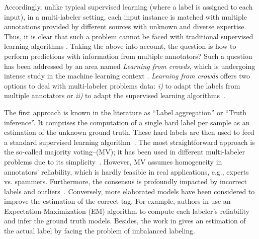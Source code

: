 \documentclass[journal]{IEEEtran}
\begin{document}
Accordingly, unlike typical supervised learning (where a label is assigned to each input), in a multi-labeler setting, each input instance is matched with multiple annotations provided by different sources with unknown and diverse expertise. Thus, it is clear that such a problem cannot be faced with traditional supervised learning algorithms \cite{tao2018domain,wang2016bi}. Taking the above into account, the question is how to perform predictions with information from multiple annotators? Such a question has been addressed by an area named \emph{Learning from crowds}, which is undergoing intense study in the machine learning context \cite{groot2011learning}. \emph{Learning from crowds} offers two options to deal with multi-labeler problems data: \textit{i)} to adapt the labels from multiple annotators or \textit{ii)} to adapt the supervised learning algorithms~\cite{rizos2020average}. 

The first approach is known in the literature as ``Label aggregation'' or ``Truth inference''. It comprises the computation of a single hard label per sample as an estimation of the unknown ground truth. These hard labels are then used to feed a standard supervised learning algorithm~\cite{morales2019scalable}. The most straightforward approach is the so-called majority voting--(MV); it has been used in different multi-labeler problems due to its simplicity~\cite{zhang2014imbalanced}. However, MV assumes homogeneity in annotators' reliability, which is hardly feasible in real applications, e.g., experts vs. spammers. Furthermore, the consensus is profoundly impacted by incorrect labels and outliers~\cite{kara2015modeling}. Conversely, more elaborated models have been considered to improve the estimation of the correct tag. For example, authors in \cite{dawid1979maximum} use an Expectation-Maximization (EM) algorithm to compute each labeler's reliability and infer the ground truth models. Besides, the work in \cite{zhang2014imbalanced} gives an estimation of the actual label by facing the problem of imbalanced labeling.  
\end{document}
